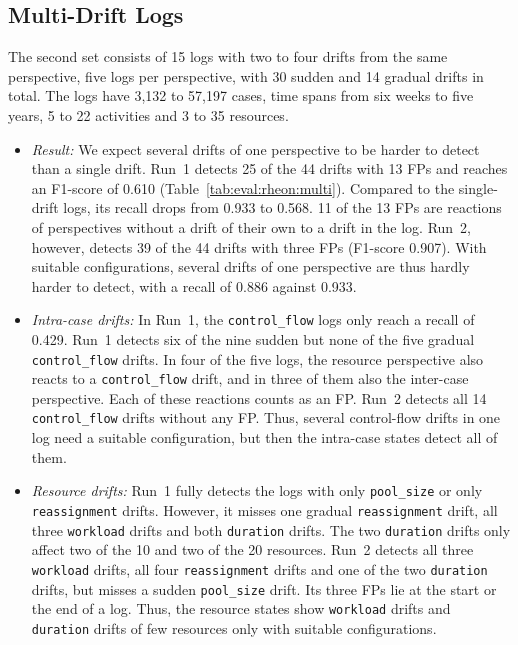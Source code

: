 \subsection{Multi-Drift Logs}
\label{sec:eval:rheon:multi}
The second set consists of 15 logs with two to four drifts from the same perspective, five logs per perspective, with 30 sudden and 14 gradual drifts in total. The logs have 3,132 to 57,197 cases, time spans from six weeks to five years, 5 to 22 activities and 3 to 35 resources.
\begin{itemize}
	\item \emph{Result:} We expect several drifts of one perspective to be harder to detect than a single drift. Run~1 detects 25 of the 44 drifts with 13 FPs and reaches an F1-score of 0.610 (Table~\ref{tab:eval:rheon:multi}). Compared to the single-drift logs, its recall drops from 0.933 to 0.568. 11 of the 13 FPs are reactions of perspectives without a drift of their own to a drift in the log. Run~2, however, detects 39 of the 44 drifts with three FPs (F1-score 0.907). With suitable configurations, several drifts of one perspective are thus hardly harder to detect, with a recall of 0.886 against 0.933.
	\item \emph{Intra-case drifts:} \label{sec:eval:rheon:multi:intra} In Run~1, the \texttt{control\_flow} logs only reach a recall of 0.429. Run~1 detects six of the nine sudden but none of the five gradual \texttt{control\_flow} drifts. In four of the five logs, the resource perspective also reacts to a \texttt{control\_flow} drift, and in three of them also the inter-case perspective. Each of these reactions counts as an FP. Run~2 detects all 14 \texttt{control\_flow} drifts without any FP. Thus, several control-flow drifts in one log need a suitable configuration, but then the intra-case states detect all of them.
	\item \emph{Resource drifts:} \label{sec:eval:rheon:multi:resource} Run~1 fully detects the logs with only \texttt{pool\_size} or only \texttt{reassignment} drifts. However, it misses one gradual \texttt{reassignment} drift, all three \texttt{workload} drifts and both \texttt{duration} drifts. The two \texttt{duration} drifts only affect two of the 10 and two of the 20 resources. Run~2 detects all three \texttt{workload} drifts, all four \texttt{reassignment} drifts and one of the two \texttt{duration} drifts, but misses a sudden \texttt{pool\_size} drift. Its three FPs lie at the start or the end of a log. Thus, the resource states show \texttt{workload} drifts and \texttt{duration} drifts of few resources only with suitable configurations.

\end{itemize}
